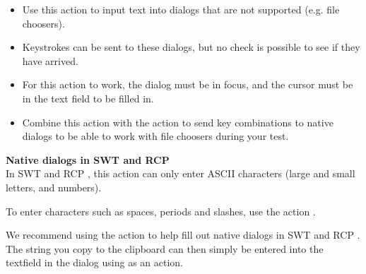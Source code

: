 
\begin{itemize}
\item Use this action to input text into dialogs that are not supported (e.g. file choosers). 
\item Keystrokes can be sent to these dialogs, but no check is possible to see if they have arrived. 
\item For this action to work, the dialog must be in focus, and the cursor must be in the text field to be filled in. 
\item Combine this action with the  action to send key combinations to native dialogs to be able to work with file choosers during your test. 
\end{itemize}

\textbf{Native dialogs in SWT and RCP \gdauts{}}\\

In SWT and RCP \gdauts{}, this action can only enter ASCII characters (large and small letters, and numbers). 

To enter characters such as spaces, periods and slashes, use the action . 

We recommend using the action  to help fill out native dialogs in SWT and RCP \gdauts{}. The string you copy to the clipboard can then simply be entered into the textfield in the dialog using  as an  action. 


